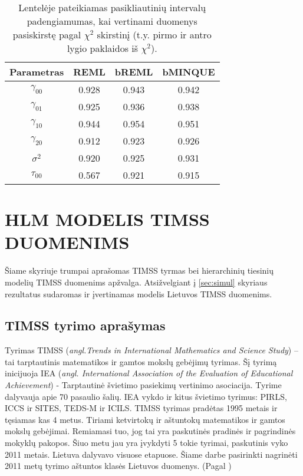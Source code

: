 \documentclass[12pt,a4paper]{article}
\begin{document}
\begin{small}
\begin{table}[H]
\label{table:ci2}
\centering
\begin{tabular}{c|ccc}
\hline
Parametras & REML & bREML & bMINQUE\\
\hline
$\gamma_{00}$ &0.928&0.943&0.942\\
$\gamma_{01}$ &0.925&0.936&0.938\\
$\gamma_{10}$ &0.944&0.954&0.951\\
$\gamma_{20}$ &0.912&0.923&0.926\\
$\sigma^2$ &0.920&0.925&0.931\\
$\tau_{00}$&0.567&0.921&0.915\\
\hline
\end{tabular}
\caption{Lentelėje pateikiamas pasikliautinių intervalų padengiamumas, kai vertinami duomenys pasiskirstę pagal $\chi^2$ skirstinį (t.y. pirmo ir antro lygio paklaidos iš $\chi^2$).}
\end{table}
\end{small}



\newpage
\section{HLM MODELIS TIMSS DUOMENIMS} \label{sec:timss}
\indent Šiame skyriuje trumpai aprašomas TIMSS tyrmas bei hierarchinių tiesinių modelių TIMSS duomenims apžvalga. Atsižvelgiant į \ref{sec:simul} skyriaus rezultatus sudaromas ir įvertinamas modelis Lietuvos TIMSS duomenims.

\subsection{TIMSS tyrimo aprašymas} \label{subsec:timss1}

\indent Tyrimas TIMSS (\textit{angl.Trends in International Mathematics and Science Study}) – tai tarptautinis matematikos ir gamtos mokslų gebėjimų tyrimas. Šį tyrimą inicijuoja IEA (\textit{angl. International Association of the Evaluation of Educational Achievement}) - Tarptautinė švietimo pasiekimų vertinimo asociacija. Tyrime dalyvauja apie 70 pasaulio šalių. IEA vykdo ir kitus švietimo tyrimus: PIRLS, ICCS ir SITES, TEDS-M ir ICILS. TIMSS tyrimas pradėtas 1995 metais ir tęsiamas kas 4 metus. Tiriami ketvirtokų ir aštuntokų matematikos ir gamtos mokslų gebėjimai. Remiamasi tuo, jog tai yra paskutinės pradinės ir pagrindinės mokyklų pakopos. Šiuo metu jau yra įvykdyti 5 tokie tyrimai, paskutinis vyko 2011 metais. Lietuva dalyvavo visuose etapuose. Šiame darbe pasirinkti nagrinėti 2011 metų tyrimo aštuntos klasės Lietuvos duomenys. (Pagal \cite{timss2011lt})
\end{document}
